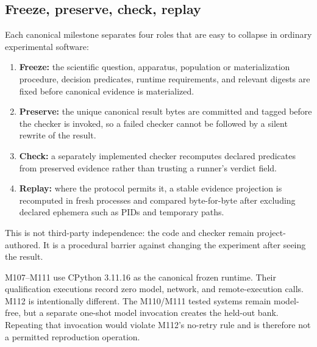 \subsection{Freeze, preserve, check, replay}
Each canonical milestone separates four roles that are easy to collapse in ordinary experimental software:
\begin{enumerate}
  \item \textbf{Freeze:} the scientific question, apparatus, population or materialization procedure, decision predicates, runtime requirements, and relevant digests are fixed before canonical evidence is materialized.
  \item \textbf{Preserve:} the unique canonical result bytes are committed and tagged before the checker is invoked, so a failed checker cannot be followed by a silent rewrite of the result.
  \item \textbf{Check:} a separately implemented checker recomputes declared predicates from preserved evidence rather than trusting a runner's verdict field.
  \item \textbf{Replay:} where the protocol permits it, a stable evidence projection is recomputed in fresh processes and compared byte-for-byte after excluding declared ephemera such as PIDs and temporary paths.
\end{enumerate}
This is not third-party independence: the code and checker remain project-authored. It is a procedural barrier against changing the experiment after seeing the result.

M107--M111 use CPython 3.11.16 as the canonical frozen runtime. Their qualification executions record zero model, network, and remote-execution calls. M112 is intentionally different. The M110/M111 tested systems remain model-free, but a separate one-shot model invocation creates the held-out bank. Repeating that invocation would violate M112's no-retry rule and is therefore not a permitted reproduction operation.

